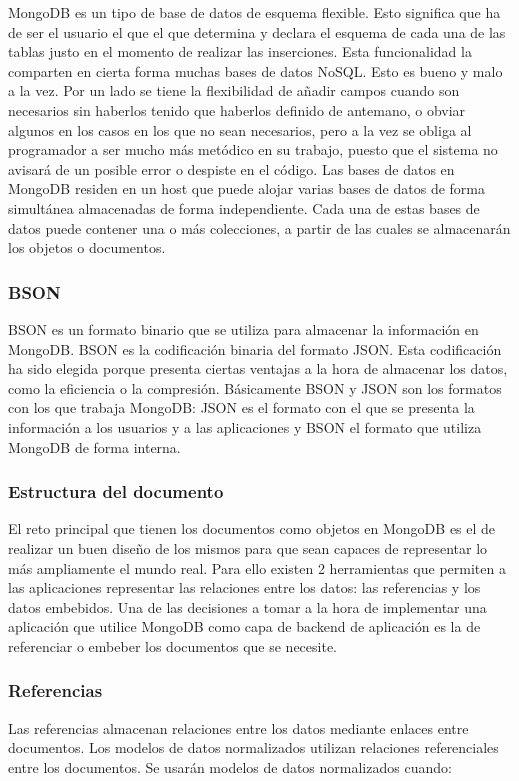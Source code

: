 \documentclass[preprint,12pt]{elsarticle}
\begin{document}
MongoDB es un tipo de base de datos de esquema flexible. Esto significa que ha de ser el usuario el que el que determina y declara el esquema de cada una de las tablas justo en el momento de realizar las inserciones. Esta funcionalidad la comparten en cierta forma muchas bases de datos NoSQL.
Esto es bueno y malo a la vez. Por un lado se tiene la flexibilidad de añadir campos cuando son necesarios sin haberlos tenido que haberlos definido de antemano, o obviar algunos en los casos en los que no sean necesarios, pero a la vez se obliga al programador a ser mucho más metódico en su trabajo, puesto que el sistema no avisará de un posible error o despiste en el código.
Las bases de datos en MongoDB residen en un host que puede alojar varias bases de datos de forma simultánea almacenadas de forma independiente. Cada una de estas bases de datos puede contener una o más colecciones, a partir de las cuales se almacenarán los objetos o documentos.

\subsubsection{\textbf{BSON}}

BSON es un formato binario que se utiliza para almacenar la información en MongoDB. BSON es la codificación binaria del formato JSON. Esta codificación ha sido elegida porque presenta ciertas ventajas a la hora de almacenar los datos, como la eficiencia o la compresión.
Básicamente BSON y JSON son los formatos con los que trabaja MongoDB: JSON es el formato con el que se presenta la información a los usuarios y a las aplicaciones y BSON el formato que utiliza MongoDB de forma interna.

\subsubsection{\textbf{Estructura del documento}}

El reto principal que tienen los documentos como objetos en MongoDB es el de realizar un buen diseño de los mismos para que sean capaces de representar lo más ampliamente el mundo real. Para ello existen 2 herramientas que permiten a las aplicaciones representar las relaciones entre los datos: las referencias y los datos embebidos. Una de las decisiones a tomar a la hora de implementar una aplicación que utilice MongoDB como capa de backend de aplicación es la de referenciar o embeber los documentos que se necesite.

\subsubsection{\textbf{Referencias}}
Las referencias almacenan relaciones entre los datos mediante enlaces entre documentos.
Los modelos de datos normalizados utilizan relaciones referenciales entre los documentos. Se usarán modelos de datos normalizados cuando:
\end{document}
